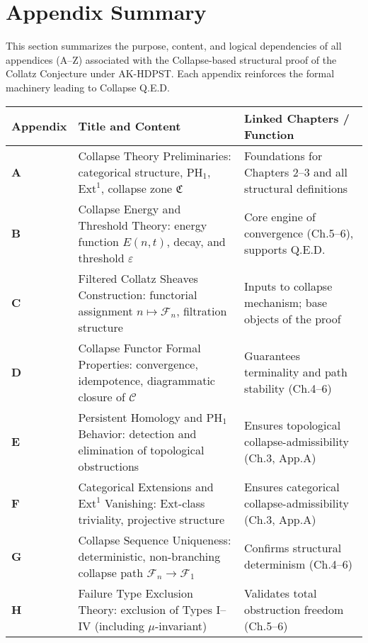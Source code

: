 \documentclass[11pt]{article}
\begin{document}
\section*{Appendix Summary}

This section summarizes the purpose, content, and logical dependencies of all appendices (A–Z) associated with the Collapse-based structural proof of the Collatz Conjecture under AK-HDPST. Each appendix reinforces the formal machinery leading to Collapse Q.E.D.

\renewcommand{\arraystretch}{1.3}
\begin{tabularx}{\textwidth}{|l|X|X|}
\hline
\textbf{Appendix} & \textbf{Title and Content} & \textbf{Linked Chapters / Function} \\
\hline
\textbf{A} & Collapse Theory Preliminaries: categorical structure, \( \mathrm{PH}_1 \), \( \mathrm{Ext}^1 \), collapse zone \( \mathfrak{C} \) & Foundations for Chapters 2–3 and all structural definitions \\
\hline
\textbf{B} & Collapse Energy and Threshold Theory: energy function \( E(n,t) \), decay, and threshold \( \varepsilon \) & Core engine of convergence (Ch.5–6), supports Q.E.D. \\
\hline
\textbf{C} & Filtered Collatz Sheaves Construction: functorial assignment \( n \mapsto \mathcal{F}_n \), filtration structure & Inputs to collapse mechanism; base objects of the proof \\
\hline
\textbf{D} & Collapse Functor Formal Properties: convergence, idempotence, diagrammatic closure of \( \mathcal{C} \) & Guarantees terminality and path stability (Ch.4–6) \\
\hline
\textbf{E} & Persistent Homology and \( \mathrm{PH}_1 \) Behavior: detection and elimination of topological obstructions & Ensures topological collapse-admissibility (Ch.3, App.A) \\
\hline
\textbf{F} & Categorical Extensions and \( \mathrm{Ext}^1 \) Vanishing: Ext-class triviality, projective structure & Ensures categorical collapse-admissibility (Ch.3, App.A) \\
\hline
\textbf{G} & Collapse Sequence Uniqueness: deterministic, non-branching collapse path \( \mathcal{F}_n \to \mathcal{F}_1 \) & Confirms structural determinism (Ch.4–6) \\
\hline
\textbf{H} & Failure Type Exclusion Theory: exclusion of Types I–IV (including \( \mu \)-invariant) & Validates total obstruction freedom (Ch.5–6) \\

\end{tabularx}
\end{document}
